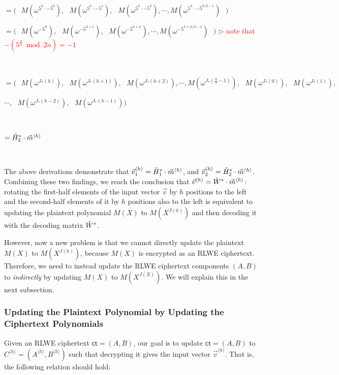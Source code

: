 $= \bm{(} \text{ } M(\omega^{5^h\cdot -5^0}), \text{ } M(\omega^{5^h\cdot -5^1}), \text{ } M(\omega^{5^h\cdot -5^2}), \cdots, M(\omega^{5^h\cdot -5^{n/2-1}}) \text{ } \bm{)}$

$= \bm{(} \text{ } M(\omega^{-5^{h}}), \text{ } M(\omega^{-5^{h+1}}), \text{ } M(\omega^{-5^{h+2}}), \cdots, M(\omega^{-5^{h+n/2-1}}) \text{ } \bm{)}$ \textcolor{red}{ $\rhd$ note that $-(5^{\frac{n}{2}} \bmod 2n) = -1$}

$ $

$= \bm{(} \text{ } M(\omega^{J_*(h)}), \text{ } M(\omega^{J_*(h+1)}), \text{ } M(\omega^{J_*(h+2)}), \cdots, M(\omega^{J_*(\frac{n}{2}-1)}), \text{ } M(\omega^{J_*(0)}), \text{ }M(\omega^{J_*(1)}),$ 
                                    
$\cdots, \text{ } M(\omega^{J_*(h-2)}), \text{ } M(\omega^{J_*(h-1)})  \bm{)}$ 

$ $

$= \tilde{H}_2^{*}\cdot \vec{m}^{\langle h \rangle}$


$ $

The above derivations demonstrate that $\vec{v}_1^{\langle h \rangle} = \tilde{H}_1^{*}\cdot \vec{m}^{\langle h \rangle}$, and $\vec{v}_2^{\langle h \rangle} = \tilde{H}_2^{*}\cdot \vec{m}^{\langle h \rangle}$. Combining these two findings, we reach the conclusion that $\vec{v}^{\langle h \rangle} = \tilde{W}^* \cdot \vec{m}^{\langle h \rangle}$: rotating the first-half elements of the input vector $\vec{v}$ by $h$ positions to the left and the second-half elements of it by $h$ positions also to the left is equivalent to updating the plaintext polynomial $M(X)$ to $M(X^{J(h)})$ and then decoding it with the decoding matrix $\tilde{W}^*$. 



However, now a new problem is that we cannot directly update the plaintext $M(X)$ to $M(X^{J(h)})$, because $M(X)$ is encrypted as an RLWE ciphertext. Therefore, we need to instead update the RLWE ciphertext components $(A, B)$ to \textit{indirectly} by updating $M(X)$ to $M(X^{J(X)})$. We will explain this in the next subsection. 


\subsubsection{Updating the Plaintext Polynomial by Updating the Ciphertext Polynomials}

Given an RLWE ciphertext $\textsf{ct} = (A, B)$, our goal is to update $\textsf{ct} = (A, B)$ to $C^{\langle h \rangle} = (A^{\langle h \rangle}, B^{\langle h \rangle})$ such that decrypting it gives the input vector $\vec{v}^{\langle h \rangle}$. That is, the following relation should hold: 

